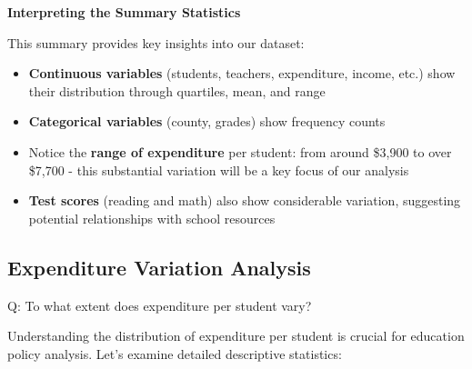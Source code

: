 \documentclass[
  12pt,
  a4paper,
]{scrbook}
\providecommand{\tightlist}{%
  \setlength{\itemsep}{0pt}\setlength{\parskip}{0pt}}
\renewcommand{\tightlist}{\setlength{\itemsep}{0.5\baselineskip}\setlength{\parskip}{0.2\baselineskip}}
\theoremstyle{plain}
\theoremstyle{definition}
\theoremstyle{remark}
\begin{document}
\textbf{Interpreting the Summary Statistics}

This summary provides key insights into our dataset:

\begin{itemize}
\tightlist
\item
  \textbf{Continuous variables} (students, teachers, expenditure,
  income, etc.) show their distribution through quartiles, mean, and
  range
\item
  \textbf{Categorical variables} (county, grades) show frequency counts
\item
  Notice the \textbf{range of expenditure} per student: from around
  {\$3,900} to over {\$7,700} - this substantial variation will be a key
  focus of our analysis
\item
  \textbf{Test scores} (reading and math) also show considerable
  variation, suggesting potential relationships with school resources
\end{itemize}

\subsection{Expenditure Variation
Analysis}\label{expenditure-variation-analysis}

Q: To what extent does expenditure per student vary?

Understanding the distribution of expenditure per student is crucial for
education policy analysis. Let's examine detailed descriptive
statistics:
\end{document}
